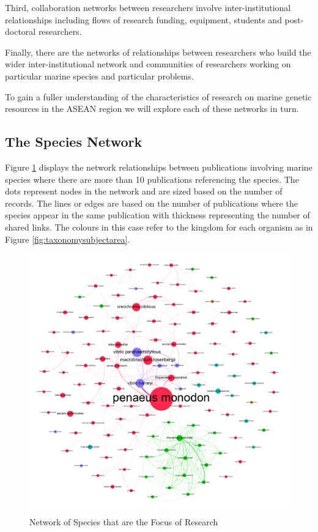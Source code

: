 \documentclass[]{book}
\theoremstyle{definition}
\theoremstyle{definition}
\theoremstyle{definition}
\theoremstyle{remark}
\begin{document}
Third, collaboration networks between researchers involve
inter-institutional relationships including flows of research funding,
equipment, students and post-doctoral researchers.

Finally, there are the networks of relationships between researchers who
build the wider inter-institutional network and communities of
researchers working on particular marine species and particular
problems.

To gain a fuller understanding of the characteristics of research on
marine genetic resources in the ASEAN region we will explore each of
these networks in turn.

\hypertarget{the-species-network}{%
\subsection{The Species Network}\label{the-species-network}}

Figure \ref{fig:speciesnetwork} displays the network relationships
between publications involving marine species where there are more than
10 publications referencing the species. The dots represent nodes in the
network and are sized based on the number of records. The lines or edges
are based on the number of publications where the species appear in the
same publication with thickness representing the number of shared links.
The colours in this case refer to the kingdom for each organism as in
Figure \ref{fig:taxonomysubjectarea}.

\begin{figure}

{\centering \includegraphics[width=1\linewidth]{images/aseanmarinlit_species_network_plus10} 

}

\caption{Network of Species that are the Focus of Research}\label{fig:speciesnetwork}
\end{figure}
\end{document}
